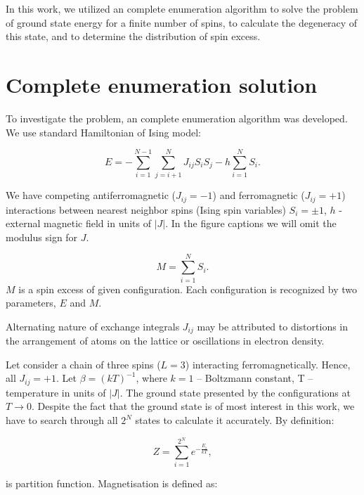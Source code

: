 \documentclass[preprint,12pt]{elsarticle}
\begin{document}
	In this work, we utilized an complete enumeration algorithm \cite{dias2023ground, padalko2021parallel} to solve the problem of ground state energy for a finite number of spins, to calculate the degeneracy of this state, and to determine the distribution of spin excess.
	
	\section{Complete enumeration solution}
	
	To investigate the problem, an complete enumeration algorithm was developed. We use standard Hamiltonian of Ising model:
	
	\begin{equation}
		E = -\sum^{N - 1}_{i=1}\sum^N_{j = i + 1} J_{ij} S_i S_j - h \sum^N_{i=1} S_i.
		\label{eq:ising_energy}
	\end{equation}
	
	We have competing antiferromagnetic ($J_{ij} = -1$) and ferromagnetic ($J_{ij} = +1$) interactions between nearest neighbor spins (Ising spin variables) $S_i = \pm1$, $h$ - external magnetic field in units of $|J|$. In the figure captions we will omit the modulus sign for $J$.
	
	\begin{equation}
		M = \sum^N_{i=1} S_i.
		\label{eq:spin_excess} 
	\end{equation}
	$M$ is a spin excess of given configuration. Each configuration is recognized by two parameters, $E$ and $M$.
	
	
	Alternating nature of exchange integrals $J_{ij}$ may be attributed to distortions in the arrangement of atoms on the lattice or oscillations in electron density.
	
	Let consider a chain of three spins ($L = 3$) interacting ferromagnetically. Hence, all $J_{ij} = +1$. Let $\beta = (kT)^{-1}$, where $k = 1$ -- Boltzmann constant, T -- temperature in units of $|J|$. The ground state presented by the configurations at $T \rightarrow 0$. Despite the fact that the ground state is of most interest in this work, we have to search through all $2^N$ states to calculate it accurately. By definition:
	
		\begin{equation}
		Z = \sum_{i = 1}^{2 ^ N} e^{-\frac{E_i}{kT}},
		\label{eq:stat_difinition}
	\end{equation}
	
	\noindent is partition function. Magnetisation is defined as: 
	
\end{document}

